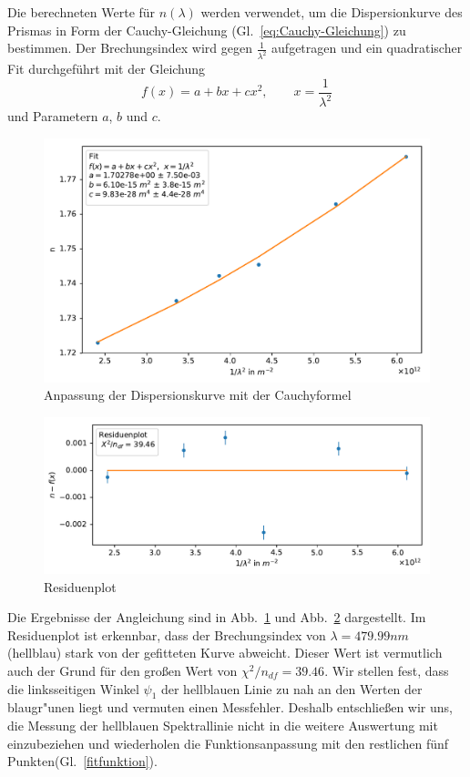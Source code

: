 \documentclass[12pt,a4paper]{article}
\begin{document}
Die berechneten Werte für $n(\lambda)$ werden verwendet, um die Dispersionkurve des Prismas in Form der Cauchy-Gleichung (Gl.~\eqref{eq:Cauchy-Gleichung}) zu bestimmen. Der Brechungsindex wird gegen $\frac{1}{\lambda^2}$ aufgetragen und ein quadratischer Fit durchgeführt mit der Gleichung
\begin{equation}\label{fitfunktion}
f(x)=a+bx+cx^2,\qquad x=\frac{1}{\lambda^2}
\end{equation}
und Parametern $a$, $b$ und $c$.\\
\newpage
\begin{figure}[H]
	\centering
	\includegraphics[width=0.95\linewidth]{Python/CdHg_Fit_Messfehler.pdf}
	\caption{Anpassung der Dispersionskurve mit der Cauchyformel}
	\label{CdHg_Fit_Messfehler}
\end{figure}
\begin{figure}[H]
	\centering
	\includegraphics[width=\linewidth]{Python/CdHg_Residuen_Messfehler.pdf}
	\caption{Residuenplot}
	\label{CdHg_Residuenplot_Messfehler}
\end{figure}
Die Ergebnisse der Angleichung sind in Abb.~\ref{CdHg_Fit_Messfehler} und Abb.~\ref{CdHg_Residuenplot_Messfehler} dargestellt. Im Residuenplot ist erkennbar, dass der Brechungsindex von $\lambda=479.99nm$ (hellblau) stark von der gefitteten Kurve abweicht. Dieser Wert ist vermutlich auch der Grund für den großen Wert von $\chi^2/n_{df}=39.46$. Wir stellen fest, dass die linksseitigen Winkel $\psi_1$ der hellblauen Linie zu nah an den Werten der blaugr"unen liegt und vermuten einen Messfehler. Deshalb entschließen wir uns, die Messung der hellblauen Spektrallinie nicht in die weitere Auswertung mit einzubeziehen und wiederholen die Funktionsanpassung mit den restlichen fünf Punkten(Gl.~\eqref{fitfunktion}).
\end{document}
